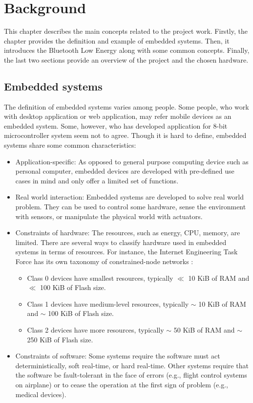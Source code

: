 \section{Background}
\justify
This chapter describes the main concepts related to the project work. Firstly,
the chapter provides the definition and example of embedded systems. Then, it
introduces the Bluetooth Low Energy along with some common concepts. Finally,
the last two sections provide an overview of the project and the chosen hardware.

\subsection{Embedded systems}
\justify
The definition of embedded systems varies among people. Some people, who 
work with desktop application or web application, may refer mobile devices 
as an embedded system. Some, however, who has developed application for 
8-bit microcontroller system seem not to agree. Though it is hard to define, 
embedded systems share some common characteristics:
\begin{itemize}
    \item Application-specific: 
        As opposed to general purpose computing device such as personal 
        computer, embedded devices are developed with pre-defined use cases 
        in mind and only offer a limited set of functions.
    \item Real world interaction:
        Embedded systems are developed to solve real world problem. They can
        be used to control some hardware, sense the environment with sensors, 
        or manipulate the physical world with actuators.  
    \item Constraints of hardware: 
        The resources, such as energy, CPU, memory, are limited. There are
        several ways to classify hardware used in embedded systems in terms 
        of resources. For instance, the Internet Engineering Task Force has 
        its own taxonomy of constrained-node networks \cite{BEK14}: 
        \begin{itemize}
            \item Class 0 devices have smallest resources, typically 
                $\ll$ 10 KiB of RAM and $\ll$ 100 KiB of Flash size.
            \item Class 1 devices have medium-level resources, typically 
                $\sim$ 10 KiB of RAM and $\sim$ 100 KiB of Flash size.
            \item Class 2 devices have more resources, typically 
                $\sim$ 50 KiB of RAM and $\sim$ 250 KiB of Flash size. 
        \end{itemize}
    \item Constraints of software: 
        Some systems require the software must act deterministically, soft 
        real-time, or hard real-time. Other systems require that the software
        be fault-tolerant in the face of errors (e.g., flight control systems
        on airplane) or to cease the operation at the first sign of problem (e.g.,
        medical devices). \cite[p.~1]{White11} 
\end{itemize}
